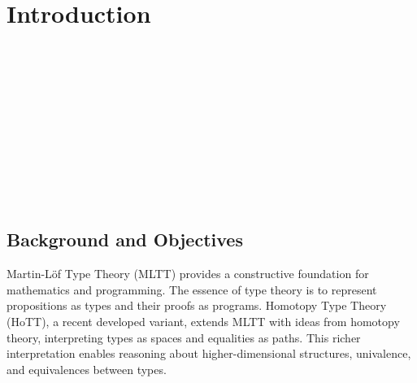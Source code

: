 \chapter{Introduction}

\begin{code}[hide]%
\>[0]\AgdaSymbol{\{-\#}\AgdaSpace{}%
\AgdaSpace{}%
\AgdaSpace{}%
\AgdaSpace{}%
\AgdaSymbol{\#-\}}\<%
\\
%
\\[\AgdaEmptyExtraSkip]%
\>[0]\AgdaSpace{}%
\AgdaSpace{}%
\<%
\\
\>[0]\AgdaSpace{}%
\AgdaSpace{}%
\<%
\\
\>[0]\AgdaSpace{}%
\AgdaSpace{}%
\<%
\\
\>[0]\AgdaSpace{}%
\AgdaSpace{}%
\<%
\\
\>[0]\AgdaSpace{}%
\AgdaSpace{}%
\<%
\\
\>[0]\AgdaSpace{}%
\AgdaSpace{}%
\AgdaSpace{}%
\AgdaSpace{}%
\AgdaSymbol{(}\AgdaSpace{}%
\AgdaSpace{}%
\AgdaSymbol{)}\<%
\\
\>[0]\AgdaSpace{}%
\AgdaSpace{}%
\<%
\\
%
\\[\AgdaEmptyExtraSkip]%
\>[0]\AgdaSpace{}%
\AgdaSpace{}%
\AgdaSymbol{:}\AgdaSpace{}%
\<%
\end{code}

\section{Background and Objectives}

Martin-Löf Type Theory (MLTT)\cite{martin1984intuitionistic}\cite{martin1998intuitionistic} provides a constructive foundation for mathematics and programming. The essence of type theory is to represent propositions as types and their proofs as programs\cite{curry1934functionality}. Homotopy Type Theory (HoTT)\cite{program2013homotopy}, a recent developed variant, extends MLTT with ideas from homotopy theory, interpreting types as spaces and equalities as paths. This richer interpretation enables reasoning about higher-dimensional structures, univalence, and equivalences between types.

